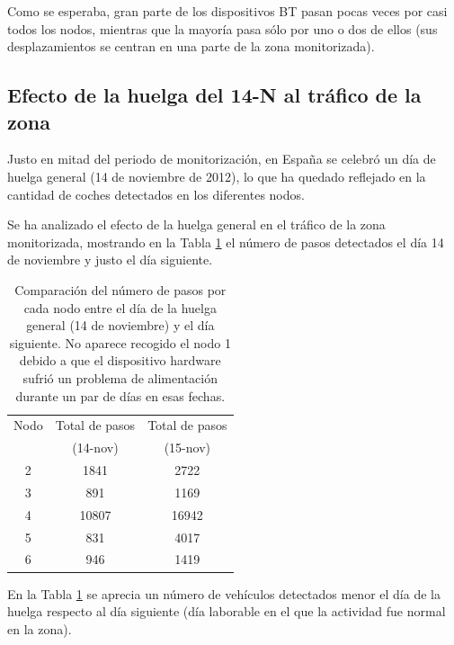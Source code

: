 \documentclass[twocolumn,twoside]{Jornadas}
\begin{document}
Como se esperaba, gran parte de los dispositivos BT pasan pocas veces por casi todos los nodos, mientras que la mayoría pasa sólo por uno o dos de ellos 
(sus desplazamientos se centran en una parte de la zona monitorizada).


 
\subsection{Efecto de la huelga del 14-N al tráfico de la zona}

Justo en mitad del periodo de monitorización, en España se celebró un día de huelga general (14 de noviembre de 2012), lo que ha quedado reflejado en la cantidad de coches detectados en los diferentes nodos.

Se ha analizado el efecto de la huelga general en el tráfico de la zona monitorizada, mostrando en la Tabla \ref{huelga} el número de pasos detectados el día 14 de noviembre y justo el día siguiente.

 \begin{table}
 \caption{Comparación del número de pasos por cada nodo entre el día de la huelga general (14 de noviembre) y el día siguiente. No aparece recogido el nodo 1 debido a que el dispositivo hardware sufrió un problema de alimentación durante un par de días en esas fechas.
 \label{huelga}}
 \begin{center}
 \begin{tabular}{|c|c|c|}
 \hline
 Nodo  &  Total de pasos  & Total de pasos  \\
       &  (14-nov) & (15-nov) \\
 \hline
 2	& 1841  & 2722  \\
 \hline
 3	& 891   & 1169 \\
 \hline
 4	& 10807	& 16942 \\
 \hline
 5	& 831  	& 4017\\
 \hline
 6	& 946   & 1419 \\
 \hline
 \end{tabular}
 \end{center}
 \end{table}

En la Tabla \ref{huelga} se aprecia un número de vehículos detectados menor el día de la huelga respecto al día siguiente (día laborable en el que la actividad fue normal en la zona).
\end{document}
